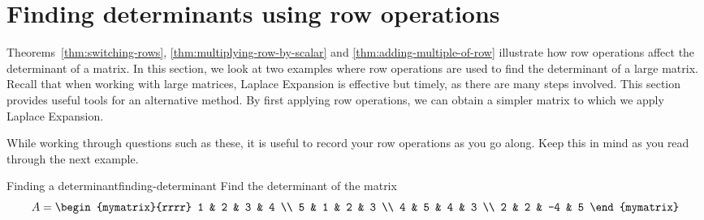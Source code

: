\section{Finding determinants using row operations}

Theorems~\ref{thm:switching-rows}, {\ref{thm:multiplying-row-by-scalar}} and {\ref{thm:adding-multiple-of-row}} illustrate 
how row operations affect the determinant of a matrix. In this section, we look at two examples where row operations are 
used to find the determinant of a large matrix. Recall that when working with large matrices, Laplace Expansion
is effective but timely, as there are many steps involved. This section provides useful tools for
an alternative method. By first applying row operations, we can obtain a simpler matrix to which we apply Laplace Expansion. 

While working through questions such as these, it is useful to record your row operations as you go along. Keep this in mind
as you read through the next example. 

\begin{example}{Finding a determinant}{finding-determinant}
Find the determinant of the matrix
\begin{equation*}
A=\begin{mymatrix}{rrrr}
1 & 2 & 3 & 4 \\
5 & 1 & 2 & 3 \\
4 & 5 & 4 & 3 \\
2 & 2 & -4 & 5
\end{mymatrix}
\end{equation*}
\end{example}

